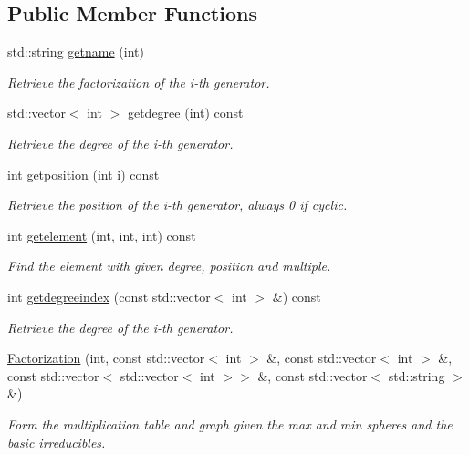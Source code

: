 \subsection*{Public Member Functions}
\begin{DoxyCompactItemize}
\item 
std\+::string \hyperlink{classMackey_1_1Factorization_ac5088227511baaaec1f62802b75d3a9e}{getname} (int)
\begin{DoxyCompactList}\small\item\em Retrieve the factorization of the i-\/th generator. \end{DoxyCompactList}\item 
std\+::vector$<$ int $>$ \hyperlink{classMackey_1_1Factorization_aef67e1ba1bf216416d0ec9923ff90b0d}{getdegree} (int) const
\begin{DoxyCompactList}\small\item\em Retrieve the degree of the i-\/th generator. \end{DoxyCompactList}\item 
int \hyperlink{classMackey_1_1Factorization_aac1009ac7388e346e5fe4754686b28b7}{getposition} (int i) const
\begin{DoxyCompactList}\small\item\em Retrieve the position of the i-\/th generator, always 0 if cyclic. \end{DoxyCompactList}\item 
int \hyperlink{classMackey_1_1Factorization_ac412da750df7b3b35ca87c3b694fd732}{getelement} (int, int, int) const
\begin{DoxyCompactList}\small\item\em Find the element with given degree, position and multiple. \end{DoxyCompactList}\item 
int \hyperlink{classMackey_1_1Factorization_ab90f461af3418417970d4be8682e965d}{getdegreeindex} (const std\+::vector$<$ int $>$ \&) const
\begin{DoxyCompactList}\small\item\em Retrieve the degree of the i-\/th generator. \end{DoxyCompactList}\item 
\hyperlink{classMackey_1_1Factorization_af1b07ab5021c4e51698c4cd3fbb85422}{Factorization} (int, const std\+::vector$<$ int $>$ \&, const std\+::vector$<$ int $>$ \&, const std\+::vector$<$ std\+::vector$<$ int $>$$>$ \&, const std\+::vector$<$ std\+::string $>$ \&)
\begin{DoxyCompactList}\small\item\em Form the multiplication table and graph given the max and min spheres and the basic irreducibles. \end{DoxyCompactList}\item 
$$
\end{DoxyCompactItemize}
